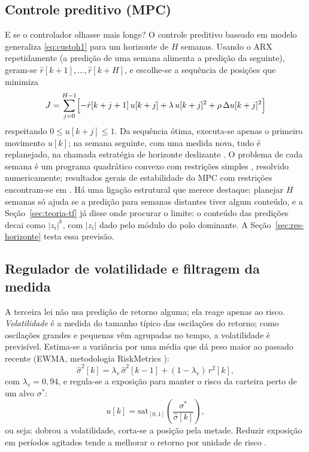 \documentclass[conference]{IEEEtran}
\begin{document}
\subsection{Controle preditivo (MPC)}

E se o controlador olhasse mais longe? O controle preditivo baseado em modelo generaliza \eqref{eq:custoh1} para um horizonte de $H$ semanas. Usando o ARX repetidamente (a predição de uma semana alimenta a predição da seguinte), geram-se $\hat{r}[k+1],\dots,\hat{r}[k+H]$, e escolhe-se a sequência de posições que minimiza
\begin{equation}
J = \sum_{j=0}^{H-1}\Bigl[-\hat{r}[k+j+1]\,u[k+j] + \lambda\,u[k+j]^2 + \rho\,\Delta u[k+j]^2\Bigr]
\label{eq:custompc}
\end{equation}
respeitando $0 \le u[k+j] \le 1$. Da sequência ótima, executa-se apenas o primeiro movimento $u[k]$; na semana seguinte, com uma medida nova, tudo é replanejado, na chamada estratégia de horizonte deslizante \cite{camacho2007}. O problema de cada semana é um programa quadrático convexo com restrições simples \cite{boyd2004}, resolvido numericamente; resultados gerais de estabilidade do MPC com restrições encontram-se em \cite{mayne2000}. Há uma ligação estrutural que merece destaque: planejar $H$ semanas só ajuda se a predição para semanas distantes tiver algum conteúdo, e a Seção~\ref{sec:teoria-tf} já disse onde procurar o limite: o conteúdo das predições decai como $|z_i|^k$, com $|z_i|$ dado pelo módulo do polo dominante. A Seção~\ref{sec:res-horizonte} testa essa previsão.

\subsection{Regulador de volatilidade e filtragem da medida}

A terceira lei não usa predição de retorno alguma; ela reage apenas ao risco. \emph{Volatilidade} é a medida do tamanho típico das oscilações do retorno; como oscilações grandes e pequenas vêm agrupadas no tempo, a volatilidade é previsível. Estima-se a variância por uma média que dá peso maior ao passado recente (EWMA, metodologia RiskMetrics \cite{riskmetrics1996}):
\begin{equation}
\hat{\sigma}^2[k] = \lambda_v\,\hat{\sigma}^2[k-1] + (1-\lambda_v)\,r^2[k],
\label{eq:ewma}
\end{equation}
com $\lambda_v = 0{,}94$, e regula-se a exposição para manter o risco da carteira perto de um alvo $\sigma^{*}$:
\begin{equation}
u[k] = \mathrm{sat}_{[0,1]}\!\left(\frac{\sigma^{*}}{\hat{\sigma}[k]}\right),
\end{equation}
ou seja: dobrou a volatilidade, corta-se a posição pela metade. Reduzir exposição em períodos agitados tende a melhorar o retorno por unidade de risco \cite{moreira2017}.
\end{document}
